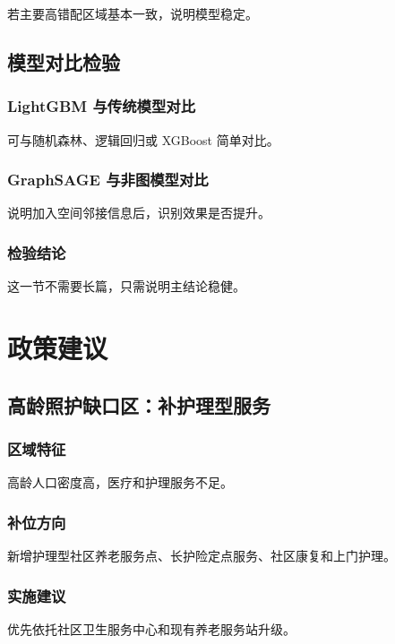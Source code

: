 \documentclass[UTF8,zihao=-4,a4paper,fontset=none]{ctexart}
\begin{document}
若主要高错配区域基本一致，说明模型稳定。

\subsection{模型对比检验}

\subsubsection{LightGBM 与传统模型对比}

可与随机森林、逻辑回归或 XGBoost 简单对比。

\subsubsection{GraphSAGE 与非图模型对比}

说明加入空间邻接信息后，识别效果是否提升。

\subsubsection{检验结论}

这一节不需要长篇，只需说明主结论稳健。

\section{政策建议}

\subsection{高龄照护缺口区：补护理型服务}

\subsubsection{区域特征}

高龄人口密度高，医疗和护理服务不足。

\subsubsection{补位方向}

新增护理型社区养老服务点、长护险定点服务、社区康复和上门护理。

\subsubsection{实施建议}

优先依托社区卫生服务中心和现有养老服务站升级。
\end{document}
